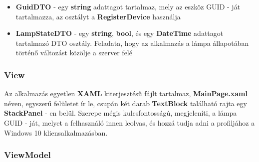 \documentclass[a4paper,12pt]{report}
\begin{document}
\begin{itemize}
    \item \textbf{GuidDTO} - egy \textbf{string} adattagot tartalmaz, mely az eszköz GUID - ját tartalmazza, az osztályt
    a \textbf{RegisterDevice} használja
    \item \textbf{LampStateDTO} - egy \textbf{string}, \textbf{bool}, és egy \textbf{DateTime} adattagot tartalmazó DTO
    osztály. Feladata, hogy az alkalmazás a lámpa állapotában történő változást közölje a szerver felé
\end{itemize}

\subsubsection{View}
    Az alkalmazás egyetlen \textbf{XAML} kiterjesztésű fájlt tartalmaz, \textbf{MainPage.xaml} néven, egyszerű felületet
    ír le, csupán két darab \textbf{TextBlock} található rajta egy \textbf{StackPanel} - en belül. Szerepe mégis kulcsfontosságú,
    megjeleníti, a lámpa GUID - ját, melyet a felhasználó innen leolvas, és hozzá tudja adni a profiljához a Windows 10 kliensalkalmazásban.

\subsubsection{ViewModel}
    


\end{document}
